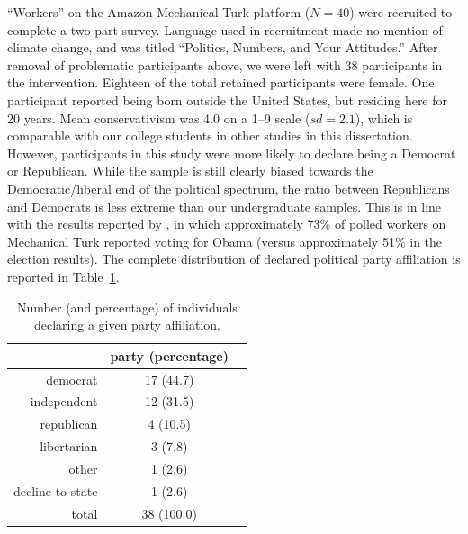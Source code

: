 “Workers” on the Amazon Mechanical Turk platform ($N=40$) were recruited to
complete a two-part survey. Language used in recruitment made no mention of
climate change, and was titled “Politics, Numbers, and Your Attitudes.” After
removal of problematic participants above, we were left with 38 participants in
the intervention. Eighteen of the total retained participants were female. One
participant reported being born outside the United States, but residing here for
20 years. Mean conservativism was 4.0 on a 1--9 scale
($sd=2.1$), which is comparable with our college students in other studies in
this dissertation. However, participants in this study were more likely to
declare being a Democrat or Republican.  While the sample is still clearly
biased towards the Democratic/liberal end of the political spectrum, the ratio
between Republicans and Democrats is less extreme than our undergraduate
samples. This is in line with the results reported by
\textcite{richey_how_2012}, in which approximately 73\% of polled workers on
Mechanical Turk reported voting for Obama (versus approximately 51\% in the
election results).  The complete distribution of declared political party
affiliation is reported in Table~\ref{table:CCO-ndi-party}.

\begin{table}[ht]
    \caption{Number (and percentage) of individuals declaring a given party
        affiliation.}
    \label{table:CCO-ndi-party}
\centering
\begin{tabular}{rcc}
  \toprule
      & party (percentage) \\ 
  \midrule
  democrat &  17 (44.7) \\ 
  independent &  12 (31.5) \\ 
  republican &   4 (10.5) \\ 
  libertarian &   3 (7.8) \\ 
  other &   1 (2.6) \\ 
  decline to state &   1 (2.6) \\ 
  \midrule
  total &  38 (100.0) \\ 
   \bottomrule
\end{tabular}
\end{table}


